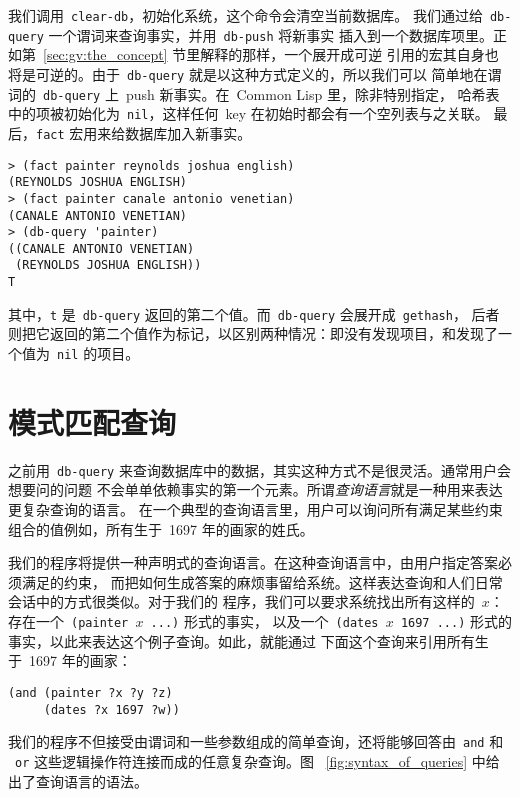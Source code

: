 我们调用~\texttt{clear-db}，初始化系统，这个命令会清空当前数据库。
我们通过给~\texttt{db-query} 一个谓词来查询事实，并用~\texttt{db-push} 将新事实
插入到一个数据库项里。正如第~\ref{sec:gv:the_concept} 节里解释的那样，一个展开成可逆
引用的宏其自身也将是可逆的。由于~\texttt{db-query} 就是以这种方式定义的，所以我们可以
简单地在谓词的~\texttt{db-query} 上~push 新事实。在~Common Lisp 里，除非特别指定，
哈希表中的项被初始化为~\texttt{nil}，这样任何~key 在初始时都会有一个空列表与之关联。
最后，\texttt{fact} 宏用来给数据库加入新事实。
\begin{lstlisting}
> (fact painter reynolds joshua english)
(REYNOLDS JOSHUA ENGLISH)
> (fact painter canale antonio venetian)
(CANALE ANTONIO VENETIAN)
> (db-query 'painter)
((CANALE ANTONIO VENETIAN)
 (REYNOLDS JOSHUA ENGLISH))
T
\end{lstlisting}
其中，\verb|t| 是~\texttt{db-query} 返回的第二个值。而~\verb|db-query| 会展开成~\texttt{gethash}，
后者则把它返回的第二个值作为标记，以区别两种情况：即没有发现项目，和发现了一个值为~\texttt{nil} 的项目。

\section{模式匹配查询}
\label{sec:pattern-matching_queries}

之前用~\texttt{db-query} 来查询数据库中的数据，其实这种方式不是很灵活。通常用户会想要问的问题
不会单单依赖事实的第一个元素。所谓\emph{查询语言}就是一种用来表达更复杂查询的语言。
在一个典型的查询语言里，用户可以询问所有满足某些约束组合的值\pozhehao{}例如，所有生于~1697
年的画家的姓氏。

我们的程序将提供一种声明式的查询语言。在这种查询语言中，由用户指定答案必须满足的约束，
而把如何生成答案的麻烦事留给系统。这样表达查询和人们日常会话中的方式很类似。对于我们的
程序，我们可以要求系统找出所有这样的~$x$：存在一个~\texttt{(painter $x$ ...)} 形式的事实，
以及一个~\texttt{(dates $x$ 1697 ...)} 形式的事实，以此来表达这个例子查询。如此，就能通过
下面这个查询来引用所有生于~1697 年的画家：
\begin{lstlisting}
(and (painter ?x ?y ?z)
     (dates ?x 1697 ?w))
\end{lstlisting}
我们的程序不但接受由谓词和一些参数组成的简单查询，还将能够回答由~\texttt{and} 和
~\texttt{or} 这些逻辑操作符连接而成的任意复杂查询。图
~\ref{fig:syntax_of_queries} 中给出了查询语言的语法。

